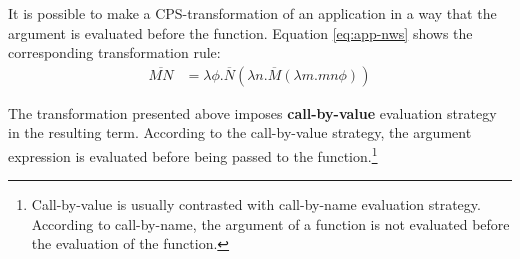 It is possible to make a CPS-transformation of an application in a way that the argument is evaluated before the function. Equation \eqref{eq:app-nws} shows the corresponding transformation rule:
%
\begin{align}
\overline{MN} & = \lambda \phi. \overline{N}(\lambda n. \overline{M}(\lambda m.mn \phi)) \label{eq:app-nws}
\end{align}

The transformation presented above imposes \textbf{call-by-value} evaluation strategy in the resulting term. According to the call-by-value strategy, the argument expression is evaluated before being passed to the function.\footnote{Call-by-value is usually contrasted with call-by-name evaluation strategy. According to call-by-name, the argument of a function is not evaluated before the evaluation of the function.} 


